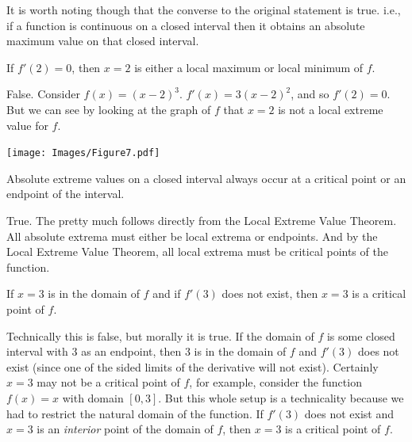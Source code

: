\documentclass[nooutcomes]{ximera}
\renewenvironment{freeResponse}{
\ifhandout\setbox0\vbox\bgroup\else
\begin{trivlist}\item[\hskip \labelsep\bfseries Solution:\hspace{2ex}]
\fi}
{\ifhandout\egroup\else
\end{trivlist}
\fi}
\begin{document}
\begin{problem}
\begin{enumerate}
\begin{freeResponse}
      It is worth noting though that the converse to the original
      statement is true.  i.e., if a function is continuous on a
      closed interval then it obtains an absolute maximum value on
      that closed interval.

    \end{freeResponse}
		
		
		

  \item If $f'(2)=0$, then $x=2$ is either a local maximum or local
    minimum of $f$.
    \begin{freeResponse}
      False.  Consider $f(x) = (x-2)^3$.  $f'(x) = 3(x-2)^2$, and so
      $f'(2) = 0$.  But we can see by looking at the graph of $f$ that
      $x=2$ is not a local extreme value for $f$.
      \begin{image}
        \texttt{[image: Images/Figure7.pdf]}
      \end{image}
    \end{freeResponse}
		
		
		

  \item Absolute extreme values on a closed interval always occur at a
    critical point or an endpoint of the interval.
    \begin{freeResponse}
      True.  The pretty much follows directly from the Local Extreme
      Value Theorem.  All absolute extrema must either be local
      extrema or endpoints.  And by the Local Extreme Value Theorem,
      all local extrema must be critical points of the function.
    \end{freeResponse}
		
		
		
  \item If $x=3$ is in the domain of $f$ and if $f'(3)$ does not
    exist, then $x=3$ is a critical point of $f$.
    \begin{freeResponse}
      Technically this is false, but morally it is true.  If the
      domain of $f$ is some closed interval with $3$ as an endpoint,
      then $3$ is in the domain of $f$ and $f'(3)$ does not exist
      (since one of the sided limits of the derivative will not
      exist).  Certainly $x=3$ may not be a critical point of $f$, for
      example, consider the function $f(x) = x$ with domain $[0,3]$.
      But this whole setup is a technicality because we had to
      restrict the natural domain of the function.  If $f'(3)$ does
      not exist and $x=3$ is an \emph{interior} point of the domain of
      $f$, then $x=3$ is a critical point of $f$.
    \end{freeResponse}
  \end{enumerate}
\end{problem}
\end{document}
